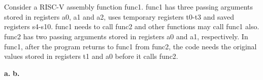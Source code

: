 \documentclass[12pt]{article}
\begin{document}
    \section{}
    \begin{flushleft}
        Consider a RISC-V assembly function func1. func1 has three passing
        arguments stored in registers a0, a1 and a2, uses temporary registers t0-t3 and
        saved registers s4-s10. func1 needs to call func2 and other functions may call func1
        also. func2 has two passing arguments stored in registers a0 and a1, respectively. In
        func1, after the program returns to func1 from func2, the code needs the original
        values stored in registers t1 and a0 before it calls func2.
    \end{flushleft}
    \textbf{a.}
    \textbf{b.}
    
    \newpage
\end{document}
